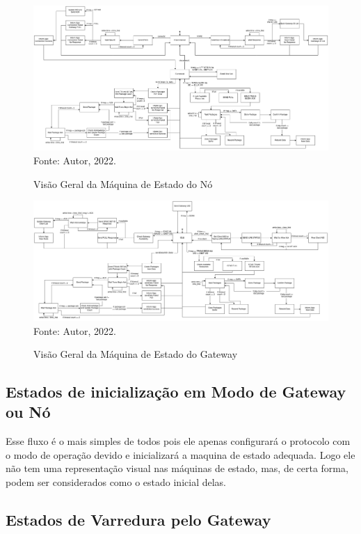 \clearpage

\begin{figure}[htp]
    \centering
	\caption{Visão Geral da Máquina de Estado do Nó}
    \includegraphics[width=\textwidth,height=0.3\textheight]{img/node_fsm.drawio.png}
    Fonte: Autor, 2022.
    \label{fig:node-fsm}
\end{figure}

\begin{figure}[htp]
    \centering
	\caption{Visão Geral da Máquina de Estado do Gateway}
    \includegraphics[width=\textwidth,height=0.315\textheight]{img/gateway_fsm.drawio.png}
    Fonte: Autor, 2022.
    \label{fig:gateway-fsm}
\end{figure}

\subsection{Estados de inicialização em Modo de Gateway ou Nó}

Esse fluxo é o mais simples de todos pois ele apenas configurará o
protocolo com o modo de operação devido e inicializará a maquina de estado
adequada. Logo ele não tem uma representação visual
nas máquinas de estado, mas, de certa forma, podem ser considerados
como o estado inicial delas.

\subsection{Estados de Varredura pelo Gateway}


